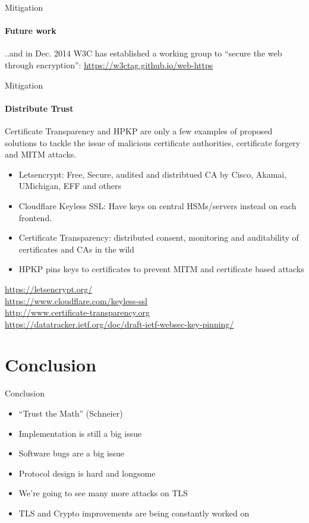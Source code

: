 \documentclass[hyperref={draft}]{beamer}
\begin{document}
\begin{frame}{Mitigation}
  \framesubtitle{Future work}
  ..and in Dec. 2014 W3C has established a working group to ``secure the web through encryption'': \url{https://w3ctag.github.io/web-https}
\end{frame}

\begin{frame}{Mitigation}
  \framesubtitle{Distribute Trust}
  Certificate Transparency and HPKP are only a few examples of proposed solutions to tackle the issue of malicious certificate authorities, certificate forgery and MITM attacks.

  \begin{itemize}
    \item Letsencrypt: Free, Secure, audited and distribtued CA by Cisco, Akamai, UMichigan, EFF and others
    \item Cloudflare Keyless SSL: Have keys on central HSMs/servers instead on each frontend.
    \item Certificate Transparency: distributed consent, monitoring and auditability of certificates and CAs in the wild
    \item HPKP pins keys to certificates to prevent MITM and certificate based attacks
  \end{itemize}

  \vspace{15px}

  \tiny
  \url{https://letsencrypt.org/}\\
  \url{https://www.cloudflare.com/keyless-ssl}\\
  \url{http://www.certificate-transparency.org}\\
  \url{https://datatracker.ietf.org/doc/draft-ietf-websec-key-pinning/}
\end{frame}

\section{Conclusion}
\begin{frame}{Conclusion}
  \begin{itemize}
    \item ``Trust the Math'' (Schneier)
    \item Implementation is still a big issue
    \item Software bugs are a big issue
    \item Protocol design is hard and longsome
    \item We're going to see many more attacks on TLS
    \item TLS and Crypto improvements are being constantly worked on
  \end{itemize} 
\end{frame}
\end{document}
